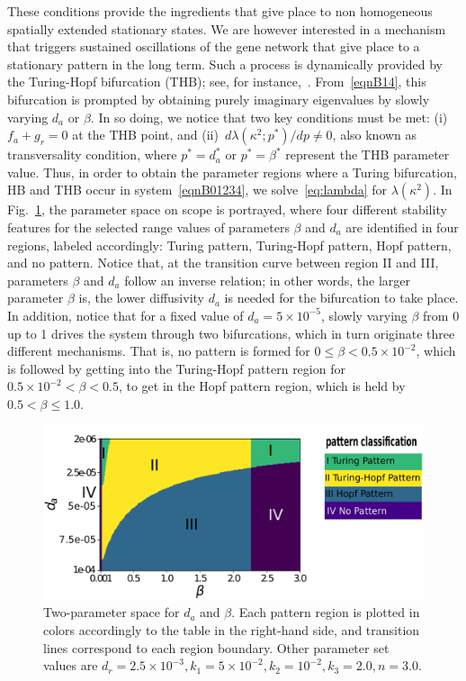 \documentclass[11pt]{article}
\begin{document}
These conditions provide the ingredients that give place to non homogeneous spatially extended stationary states. We are however interested in a mechanism that triggers sustained oscillations of the gene network that give place to a stationary pattern in the long term. Such a process is dynamically provided by the Turing-Hopf bifurcation (THB); see, for instance,~\citep{Castillo2016, liu}. From~\eqref{eqnB14}, this bifurcation is prompted by obtaining purely imaginary eigenvalues by slowly varying $d_a$ or $\beta$. In so doing, we notice that two key conditions must be met: (i)~$f_a + g_r=0$ at the THB point, and (ii)~$d\lambda(\kappa^2;p^*)/dp\neq0$, also known as transversality condition, where $p^*=d_a^*$ or $p^*=\beta^*$ represent the THB parameter value. Thus, in order to obtain the parameter regions where a Turing bifurcation, HB and THB occur in system~\eqref{eqnB01234}, we solve~\eqref{eq:lambda} for $\lambda(\kappa^2)$. In Fig.~\ref{FigB01}, the parameter space on scope is portrayed, where four different stability features for the selected range values of parameters $\beta$ and $d_a$ are identified in four regions, labeled accordingly: Turing pattern, Turing-Hopf pattern, Hopf pattern, and no pattern. Notice that, at the transition curve between region II and III, parameters $\beta$ and $d_a$ follow an inverse relation; in other words, the larger parameter $\beta$ is, the lower diffusivity $d_a$ is needed for the bifurcation to take place. In addition, notice that for a fixed value of $d_a=5\times10^{-5}$, slowly varying $\beta$ from 0 up to 1 drives the system through two bifurcations, which in turn originate three different mechanisms. That is, no pattern is formed for $0\leq\beta < 0.5\times10^{-2}$, which is followed by getting into the Turing-Hopf pattern region for $ 0.5\times10^{-2}<\beta<0.5$, to get in the Hopf pattern region, which is held by $ 0.5<\beta\leq 1.0$. 

\begin{figure}[t!]
	\centering
	\includegraphics[width=5.0in]{Figures/ApFigure01}
	\caption{Two-parameter space for $d_a$ and $\beta$. Each pattern region is plotted in colors accordingly to the table in the right-hand side, and transition lines correspond to each region boundary. Other parameter set values are $d_r = 2.5\times10^{-3}, k_1 = 5\times10^{-2}, k_2=10^{-2}, k_3=2.0, n=3.0$.}
	\label{FigB01}
\end{figure}
\end{document}
